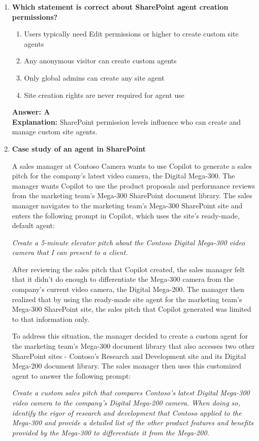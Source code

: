 \documentclass[10pt]{article}
\begin{document}
\begin{enumerate}[leftmargin=*]
\item \textbf{Which statement is correct about SharePoint agent creation permissions?}
\begin{enumerate}[label=\Alph*.]
  \item Users typically need Edit permissions or higher to create custom site agents
  \item Any anonymous visitor can create custom agents
  \item Only global admins can create any site agent
  \item Site creation rights are never required for agent use
\end{enumerate}
\textbf{Answer: A}\\
\textbf{Explanation:} SharePoint permission levels influence who can create and manage custom site agents.

\item 
\textbf{Case study of an agent in SharePoint}

 A sales manager at Contoso Camera wants to use Copilot to generate a sales pitch for the company's latest video camera, the Digital Mega-300. The manager wants Copilot to use the product proposals and performance reviews from the marketing team’s Mega-300 SharePoint document library. The sales manager navigates to the marketing team's Mega-300 SharePoint site and enters the following prompt in Copilot, which uses the site's ready-made, default agent:

\textit{Create a 5-minute elevator pitch about the Contoso Digital Mega-300 video camera that I can present to a client.}

After reviewing the sales pitch that Copilot created, the sales manager felt that it didn't do enough to differentiate the Mega-300 camera from the company's current video camera, the Digital Mega-200. The manager then realized that by using the ready-made site agent for the marketing team's Mega-300 SharePoint site, the sales pitch that Copilot generated was limited to that information only.

To address this situation, the manager decided to create a custom agent for the marketing team's Mega-300 document library that also accesses two other SharePoint sites - Contoso's Research and Development site and its Digital Mega-200 document library. The sales manager then uses this customized agent to answer the following prompt:

\textit{Create a custom sales pitch that compares Contoso's latest Digital Mega-300 video camera to the company's Digital Mega-200 camera. When doing so, identify the rigor of research and development that Contoso applied to the Mega-300 and provide a detailed list of the other product features and benefits provided by the Mega-300 to differentiate it from the Mega-200.}


\end{enumerate}
\end{document}
